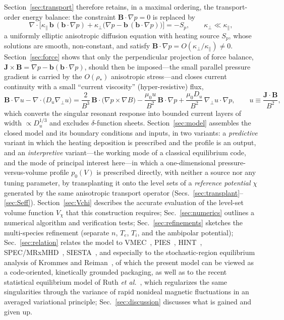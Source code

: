 \documentclass[english]{article}
\newcommand{\bB}{\mathbf{B}}
\newcommand{\bJ}{\mathbf{J}}
\newcommand{\bb}{\mathbf{b}}
\newcommand{\gradperp}{\nabla_{\!\perp}}
\begin{document}
Section~\ref{sec:transport} therefore retains, in a maximal ordering, the transport-order energy
balance: the constraint $\bB\cdot\nabla p=0$ is replaced by
\begin{equation}
\nabla\cdot\Big[\kappa_\parallel\,\bb\,(\bb\cdot\nabla p)
+\kappa_\perp\big(\nabla p-\bb\,(\bb\cdot\nabla p)\big)\Big]=-S_p,
\qquad \kappa_\perp\ll\kappa_\parallel ,
\label{eq:p_preview}
\end{equation}
a uniformly elliptic anisotropic diffusion equation with heating source $S_p$, whose solutions are
smooth, non-constant, and satisfy $\bB\cdot\nabla p=O(\kappa_\perp/\kappa_\parallel)\ne0$.
Section~\ref{sec:force} shows that only the perpendicular projection of force balance,
$\bJ\times\bB=\nabla p-\bb(\bb\cdot\nabla p)$, should then be imposed---the small parallel pressure
gradient is carried by the $O(\rho_*)$ anisotropic stress---and closes current continuity with a
small ``current viscosity'' (hyper-resistive) flux,
\begin{equation}
\bB\cdot\nabla u-\nabla\cdot\big(D_u\gradperp u\big)
=\frac{2}{B^{3}}\,\bB\cdot\big(\nabla p\times\nabla B\big)
-\frac{\mu_0 u}{B^{2}}\,\bB\cdot\nabla p
+\frac{\mu_0 D_u}{B^{2}}\,\gradperp u\cdot\nabla p ,
\qquad u\equiv\frac{\bJ\cdot\bB}{B^{2}},
\label{eq:u_preview}
\end{equation}
which converts the singular resonant response into bounded current layers of width
$\propto D_u^{1/3}$ and excludes $\delta$-function sheets. Section~\ref{sec:model} assembles the
closed model and its boundary conditions and inputs, in two variants: a \emph{predictive} variant
in which the heating deposition is prescribed and the profile is an output, and an
\emph{interpretive} variant---the working mode of a classical equilibrium code, and the mode of
principal interest here---in which a one-dimensional pressure-versus-volume profile $p_0(V)$ is
prescribed directly, with neither a source nor any tuning parameter, by transplanting it onto the
level sets of a \emph{reference potential} $\chi$ generated by the same anisotropic transport
operator (Secs.~\ref{sec:transplant}--\ref{sec:Seff}). Section~\ref{sec:Vchi} describes the
accurate evaluation of the level-set volume function $V_\chi$ that this construction requires;
Sec.~\ref{sec:numerics} outlines a numerical
algorithm and verification tests; Sec.~\ref{sec:refinements} sketches the multi-species refinement
(separate $n$, $T_e$, $T_i$, and the ambipolar potential); Sec.~\ref{sec:relation} relates the
model to VMEC~\cite{hirshman1983}, PIES~\cite{reiman1986}, HINT~\cite{harafuji1989,suzuki2006},
SPEC/MRxMHD~\cite{hudson2012,qu2021}, SIESTA~\cite{hirshman2011}, and especially to the
stochastic-region equilibrium analysis of Krommes and Reiman~\cite{krommes2009}, of which the
present model can be viewed as a code-oriented, kinetically grounded packaging, as well as to the
recent statistical equilibrium model of Ruth \emph{et al.}~\cite{ruth2026}, which regularizes the
same singularities through the variance of rapid nonideal magnetic fluctuations in an averaged
variational principle;
Sec.~\ref{sec:discussion} discusses what is gained and given up.
\end{document}
